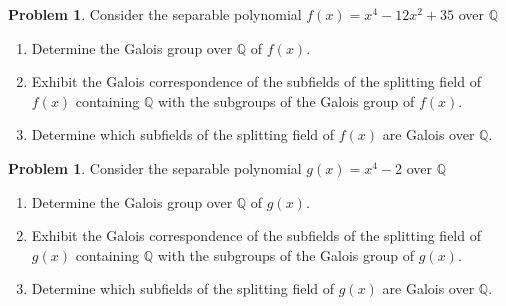 \documentclass[11pt]{scrartcl}
\theoremstyle{definition}
\newtheorem{problem}[theorem]{Problem}
\begin{document}
\begin{problem}
Consider the separable polynomial $f(x)=x^4-12x^2+35$ over $\mathbb{Q}$
\begin{enumerate}[label=\rm{(\alph*)}]
\item Determine the Galois group over $\mathbb{Q}$ of $f(x)$.
\item Exhibit the Galois correspondence of the subfields of the splitting field of $f(x)$ containing $\mathbb{Q}$ with the subgroups of the Galois group of $f(x)$.
\item Determine which subfields of the splitting field of $f(x)$ are Galois over $\mathbb{Q}$.
\end{enumerate} 
\end{problem}

\begin{problem}
Consider the separable polynomial $g(x)=x^4-2$ over $\mathbb{Q}$
\begin{enumerate}[label=\rm{(\alph*)}]
\item Determine the Galois group over $\mathbb{Q}$ of $g(x)$.
\item Exhibit the Galois correspondence of the subfields of the splitting field of $g(x)$ containing $\mathbb{Q}$ with the subgroups of the Galois group of $g(x)$.
\item Determine which subfields of the splitting field of $g(x)$ are Galois over $\mathbb{Q}$.
\end{enumerate} 
\end{problem}

\end{document}
